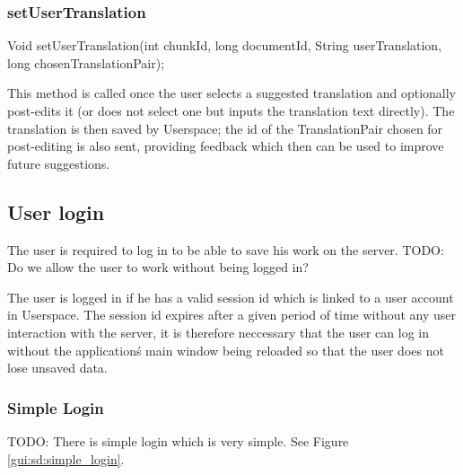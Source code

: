 \subsubsection{setUserTranslation}
	Void setUserTranslation(int chunkId, long documentId, String userTranslation, long chosenTranslationPair);

This method is called once the user selects a suggested translation and optionally post-edits it
(or does not select one but inputs the translation text directly).
The translation is then saved by Userspace;
the id of the TranslationPair chosen for post-editing is also sent, providing feedback which then can be used to improve future suggestions.

\subsection{User login}

The user is required to log in to be able to save his work on the server.
TODO: Do we allow the user to work without being logged in?

The user is logged in if he has a valid session id which is linked to a user account in Userspace.
The session id expires after a given period of time without any user interaction with the server,
it is therefore neccessary that the user can log in without the application\'s main window being reloaded so that the user does not lose unsaved data.

\subsubsection{Simple Login}
\label{subsec:simple_login}

TODO: There is simple login which is very simple. See Figure \ref{gui:sd:simple_login}.


